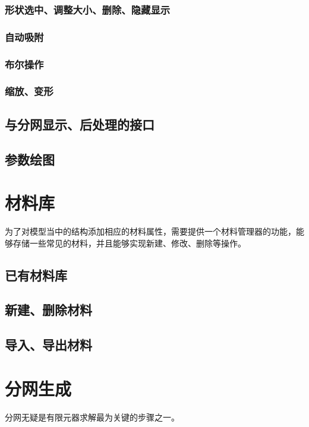 \subsubsection{形状选中、调整大小、删除、隐藏显示}

\subsubsection{自动吸附}

\subsubsection{布尔操作}

\subsubsection{缩放、变形}

\subsection{与分网显示、后处理的接口}

\subsection{参数绘图}

\section{材料库}
为了对模型当中的结构添加相应的材料属性，需要提供一个材料管理器的功能，能够存储一些常见的材料，并且能够实现新建、修改、删除等操作。
\subsection{已有材料库}

\subsection{新建、删除材料}

\subsection{导入、导出材料}

\section{分网生成}
分网无疑是有限元器求解最为关键的步骤之一。
